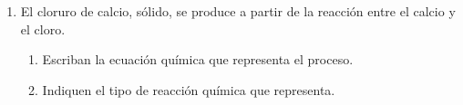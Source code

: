 \documentclass[../Práctica.root.tex]{subfiles}
\begin{document}
\begin{enumerate}
    \item El cloruro de calcio, sólido, se produce a partir de la reacción entre el calcio y el cloro.
          \begin{enumerate}
              \item Escriban la ecuación química que representa el proceso.
              \item Indiquen el tipo de reacción química que representa.
          \end{enumerate}
\end{enumerate}
\end{document}
